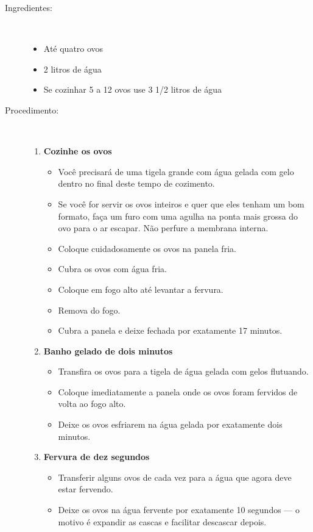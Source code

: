 \documentclass [11pt, letterpaper] {article}
\begin{document}
\begin {description}

\item [Ingredientes:] \ \\
\begin {itemize}
\item Até quatro ovos
\item 2 litros de água
\item Se cozinhar 5 a 12 ovos use 3 1/2 litros de água
\end {itemize}


\item [Procedimento:] \ \\
\begin {enumerate}
\item {\bf Cozinhe os ovos}
\begin {itemize}
\item Você precisará de uma tigela grande com água gelada com gelo dentro no final deste tempo de cozimento.
\item Se voc\^e for servir os ovos inteiros e quer que eles tenham um bom formato, fa\c{c}a um furo com uma agulha na ponta mais grossa do ovo para o ar escapar. N\~ao perfure a membrana interna.
\item Coloque cuidadosamente os ovos na panela fria.
\item Cubra os ovos com água fria.
\item Coloque em fogo alto at\'e levantar a fervura.
\item Remova do fogo.
\item Cubra a panela e deixe fechada por exatamente 17 minutos.
\end {itemize}
\item {\bf Banho gelado de dois minutos}
\begin {itemize}
\item Transfira os ovos para a tigela de água gelada com gelos flutuando.
\item Coloque imediatamente a panela onde os ovos foram fervidos de volta ao fogo alto.
\item Deixe os ovos esfriarem na água gelada por exatamente dois minutos.
\end {itemize}
\item {\bf Fervura de dez segundos}
\begin {itemize}
\item Transferir alguns ovos de cada vez para a água que agora deve estar fervendo.
\item Deixe os ovos na água fervente por exatamente 10 segundos --- o motivo é expandir as cascas e facilitar descascar depois.

\end{itemize}
\end{enumerate}
\end{description}
\end{document}
